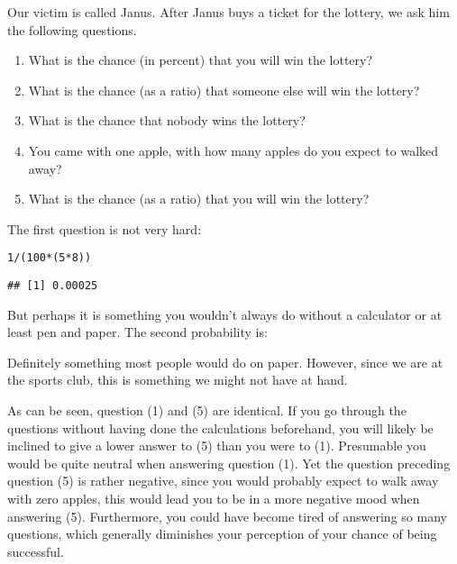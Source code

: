 \documentclass[a4paper]{book}\usepackage{graphicx, color}
\makeatletter
\newenvironment{kframe}{%
 \def\at@end@of@kframe{}%
 \ifinner\ifhmode%
  \def\at@end@of@kframe{\end{minipage}}%
  \begin{minipage}{\columnwidth}%
 \fi\fi%
 \def\FrameCommand##1{\hskip\@totalleftmargin \hskip-\fboxsep
 \colorbox{shadecolor}{##1}\hskip-\fboxsep
     \hskip-\linewidth \hskip-\@totalleftmargin \hskip\columnwidth}%
 \MakeFramed {\advance\hsize-\width
   \@totalleftmargin\z@ \linewidth\hsize
   \@setminipage}}%
 {\par\unskip\endMakeFramed%
 \at@end@of@kframe}
\newenvironment{knitrout}{}{} %
\makeatother
\begin{document}
Our victim is called Janus. After Janus buys a ticket for the lottery,
we ask him the following questions.

\begin{enumerate}
\def\labelenumi{\arabic{enumi}.}
\itemsep1pt\parskip0pt
\item
  What is the chance (in percent) that you will win the lottery?
\item
  What is the chance (as a ratio) that someone else will win the
  lottery?
\item
  What is the chance that nobody wins the lottery?
\item
  You came with one apple, with how many apples do you expect to walked
  away?
\item
  What is the chance (as a ratio) that you will win the lottery?
\end{enumerate}

The first question is not very hard:

\begin{knitrout}
\color{fgcolor}\begin{kframe}
\begin{alltt}
1/(100 * (5 * 8))
\end{alltt}
\begin{verbatim}
## [1] 0.00025
\end{verbatim}
\end{kframe}
\end{knitrout}


But perhaps it is something you wouldn't always do without a calculator
or at least pen and paper. The second probability is:

Definitely something most people would do on paper. However, since we
are at the sports club, this is something we might not have at hand.

As can be seen, question (1) and (5) are identical. If you go through
the questions without having done the calculations beforehand, you will
likely be inclined to give a lower answer to (5) than you were to (1).
Presumable you would be quite neutral when answering question (1). Yet
the question preceding question (5) is rather negative, since you would
probably expect to walk away with zero apples, this would lead you to be
in a more negative mood when answering (5). Furthermore, you could have
become tired of answering so many questions, which generally diminishes
your perception of your chance of being successful.
\end{document}
